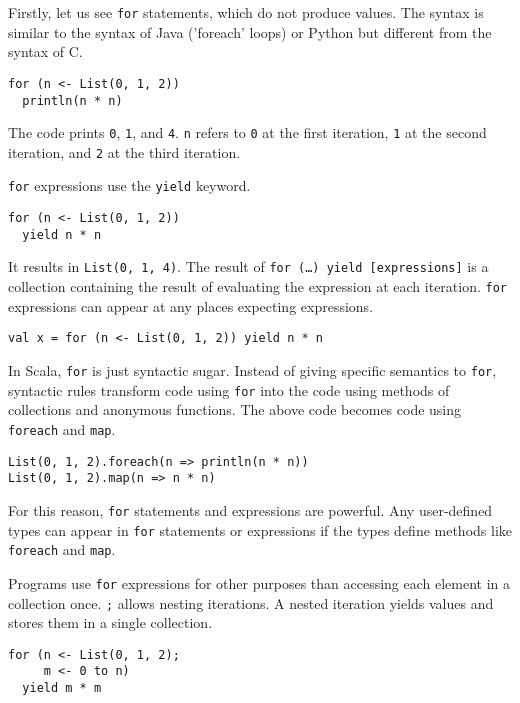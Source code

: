 Firstly, let us see \verb!for! statements, which do not produce values. The
syntax is similar to the syntax of Java ('foreach' loops) or Python but different
from the syntax of C.

\begin{verbatim}
for (n <- List(0, 1, 2))
  println(n * n)
\end{verbatim}

The code prints \verb!0!, \verb!1!, and \verb!4!. \verb!n! refers to \verb!0! at
the first iteration, \verb!1! at the second iteration, and \verb!2! at the third
iteration.

\verb!for! expressions use the \verb!yield! keyword.

\begin{verbatim}
for (n <- List(0, 1, 2))
  yield n * n
\end{verbatim}

It results in \verb!List(0, 1, 4)!. The result of \verb!for (…) yield [expressions]!
is a collection containing the result of evaluating the expression
at each iteration. \verb!for! expressions can appear at any places expecting
expressions.

\begin{verbatim}
val x = for (n <- List(0, 1, 2)) yield n * n
\end{verbatim}

In Scala, \verb!for! is just syntactic sugar. Instead of giving specific
semantics to \verb!for!, syntactic rules transform code using \verb!for! into the
code using methods of collections and anonymous functions. The above code becomes
code using \verb!foreach! and \verb!map!.

\begin{verbatim}
List(0, 1, 2).foreach(n => println(n * n))
List(0, 1, 2).map(n => n * n)
\end{verbatim}

For this reason, \verb!for! statements and expressions are powerful. Any
user-defined types can appear in \verb!for! statements or expressions if the
types define methods like \verb!foreach! and \verb!map!.

Programs use \verb!for! expressions for other purposes than accessing each
element in a collection once. \verb!;! allows nesting iterations. A nested
iteration yields values and stores them in a single collection.

\begin{verbatim}
for (n <- List(0, 1, 2);
     m <- 0 to n)
  yield m * m
\end{verbatim}

